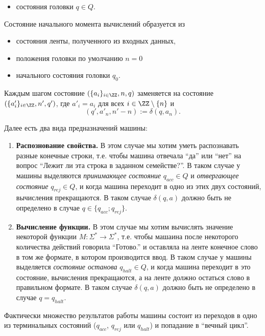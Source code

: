 \documentclass[12pt,a4paper]{article}
\begin{document}
\begin{definition}
\begin{itemize}
            \item состояния головки $q \in Q$.
        \end{itemize}
        Состояние начального момента вычислений образуется из
        \begin{itemize}
            \item состояния ленты, полученного из входных данных,
            \item положения головки по умолчанию $n = 0$
            \item начального состояния головки $q_0$.
        \end{itemize}
        Каждым шагом состояние $(\{a_i\}_{i \in \ZZ}, n, q)$ заменяется на состояние $(\{a'_i\}_{i \in \ZZ}, n', q')$, где $a'_i = a_i$ для всех $i \in \ZZ \setminus \{n\}$ и
        \[
            (q', a'_n, n'-n) := \delta(q, a_n).
        \]

        Далее есть два вида предназначений машины:
        \begin{enumerate}
            \item \textbf{Распознование свойства.} В этом случае мы хотим уметь распознавать разные конечные строки, т.е. чтобы машина отвечала ``да'' или ``нет'' на вопрос ``Лежит ли эта строка в заданном семействе?''. В таком случае у машины выделяются \emph{принимающее состояние} $q_{acc} \in Q$ и \emph{отвергающее состояние} $q_{rej} \in Q$, и когда машина переходит в одно из этих двух состояний, вычисления прекращаются. В таком случае $\delta(q, a)$ должно быть не определено в случае $q \in \{q_{acc}; q_{rej}\}$.
            \item \textbf{Вычисление функции.} В этом случае мы хотим вычислять значение некоторой функции $M: \Sigma^* \to \Sigma^*$, т.е. чтобы машаина после некоторого количества действий говорила ``Готово.'' и оставляла на ленте конечное слово в том же формате, в котором производится ввод. В таком случае у машины выделяется \emph{состояние останова} $q_{halt} \in Q$, и когда машина переходит в это состояние, вычисления прекращаются, а на ленте должно остаться слово в правильном формате. В таком случае $\delta(q, a)$ должно быть не определено в случае $q = q_{halt}$.
        \end{enumerate}
    \end{definition}

    \begin{remark*}
        Фактически множество результатов работы машины состоит из переходов в одно из терминальных состояний ($q_{acc}$, $q_{rej}$ или $q_{halt}$) и попадание в ``вечный цикл''.
    \end{remark*}
\end{document}
